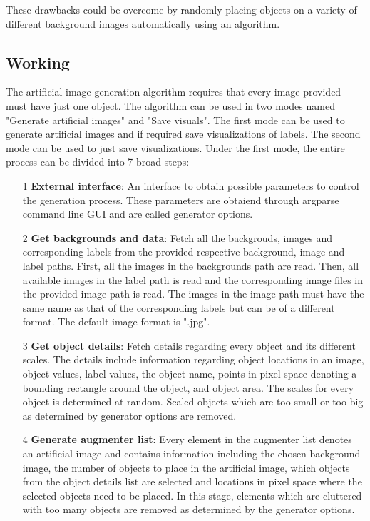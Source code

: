 These drawbacks could be overcome by randomly placing objects on a variety of different background images automatically using an algorithm.

\subsection{Working}
The artificial image generation algorithm requires that every image provided must have just one object. The algorithm can be used in two modes named "Generate artificial images" and "Save visuals". The first mode can be used to generate artificial images and if required save visualizations of labels. The second mode can be used to just save visualizations. Under the first mode, the entire process can be divided into 7 broad steps:
	\begin{itemize}
		\item[1] \textbf{External interface}: An interface to obtain possible parameters to control the generation process. These parameters are obtaiend through argparse command line GUI and are called generator options.
		\item[2] \textbf{Get backgrounds and data}: Fetch all the backgrouds, images and corresponding labels from the provided respective background, image and label paths. First, all the images in the backgrounds path are read. Then, all available images in the label path is read and the corresponding image files in the provided image path is read. The images in the image path must have the same name as that of the corresponding labels but can be of a different format. The default image format is ".jpg".
		\item[3] \textbf{Get object details}: Fetch details regarding every object and its different scales. The details include information regarding object locations in an image, object values, label values, the object name, points in pixel space denoting a bounding rectangle around the object, and object area. The scales for every object is determined at random. Scaled objects which are too small or too big as determined by generator options are removed.
		\item[4] \textbf{Generate augmenter list}: Every element in the augmenter list denotes an artificial image and contains information including the chosen background image, the number of objects to place in the artificial image, which objects from the object details list are selected and locations in pixel space where the selected objects need to be placed. In this stage, elements which are cluttered with too many objects are removed as determined by the generator options.

\end{itemize}
